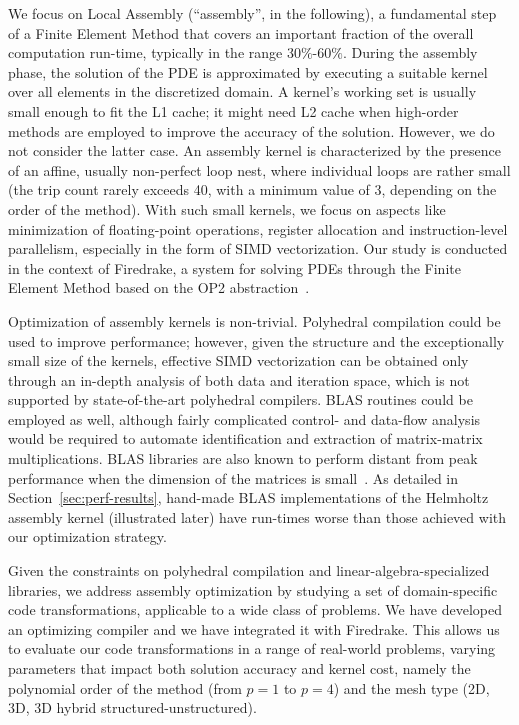 \documentclass[conference]{IEEEtran}
\begin{document}
We focus on Local Assembly (``assembly'', in the following), a fundamental step of a Finite Element Method that covers an important fraction of the overall computation run-time, typically in the range 30$\%$-60$\%$. During the assembly phase, the solution of the PDE is approximated by executing a suitable kernel over all elements in the discretized domain. A kernel's working set is usually small enough to fit the L1 cache; it might need L2 cache when high-order methods are employed to improve the accuracy of the solution. However, we do not consider the latter case. An assembly kernel is characterized by the presence of an affine, usually non-perfect loop nest, where individual loops are rather small (the trip count rarely exceeds 40, with a minimum value of 3, depending on the order of the method). With such small kernels, we focus on aspects like minimization of floating-point operations, register allocation and instruction-level parallelism, especially in the form of SIMD vectorization. Our study is conducted in the context of Firedrake, a system for solving PDEs through the Finite Element Method based on the OP2 abstraction~\cite{firedrake}.

Optimization of assembly kernels is non-trivial. Polyhedral compilation could be used to improve performance; however, given the structure and the exceptionally small size of the kernels, effective SIMD vectorization can be obtained only through an in-depth analysis of both data and iteration space, which is not supported by state-of-the-art polyhedral compilers. BLAS routines could be employed as well, although fairly complicated control- and data-flow analysis would be required to automate identification and extraction of matrix-matrix multiplications. BLAS libraries are also known to perform distant from peak performance when the dimension of the matrices is small~\cite{nek5000}. As detailed in Section~\ref{sec:perf-results}, hand-made BLAS implementations of the Helmholtz assembly kernel (illustrated later) have run-times worse than those achieved with our optimization strategy. 



Given the constraints on polyhedral compilation and linear-algebra-specialized libraries, we address assembly optimization by studying a set of domain-specific code transformations, applicable to a wide class of problems. We have developed an optimizing compiler and we have integrated it with Firedrake. This allows us to evaluate our code transformations in a range of real-world problems, varying parameters that impact both solution accuracy and kernel cost, namely the polynomial order of the method (from $p=1$ to $p=4$) and the mesh type (2D, 3D, 3D hybrid structured-unstructured). 
\end{document}
